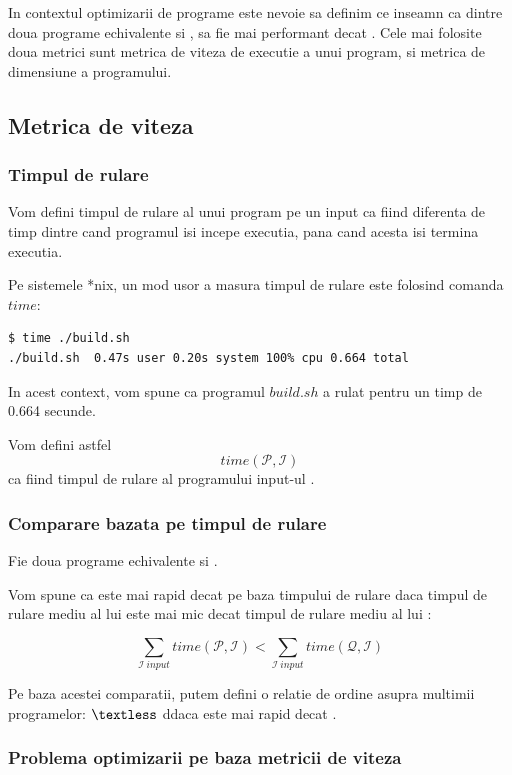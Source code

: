 In contextul optimizarii de programe este nevoie sa definim ce
inseamn ca dintre doua programe echivalente  si , 
sa fie mai performant decat .
Cele mai folosite doua metrici sunt metrica de viteza de
executie a unui program, si metrica de dimensiune a programului.

\subsection{Metrica de viteza}

\subsubsection{Timpul de rulare}

Vom defini timpul de rulare al unui program  pe un input
 ca fiind diferenta de timp dintre cand programul isi incepe
executia, pana cand acesta isi termina executia.

Pe sistemele *nix, un mod usor a masura timpul de rulare este
folosind comanda $time$:

\begin{lstlisting}[language=Bash]
$ time ./build.sh
./build.sh  0.47s user 0.20s system 100% cpu 0.664 total
\end{lstlisting}

In acest context, vom spune ca programul $build.sh$ a rulat
pentru un timp de 0.664 secunde.

Vom defini astfel \[time(\mathcal{P}, \mathcal{I})\] ca fiind
timpul de rulare al programului  input-ul .

\subsubsection{Comparare bazata pe timpul de rulare}

Fie doua programe echivalente  si .

Vom spune ca  este mai rapid decat  pe baza timpului de
rulare daca timpul de rulare mediu al lui  este mai mic
decat timpul de rulare mediu al lui :

\[
    \sum_{\mathcal{I} \ input} time(\mathcal{P}, \mathcal{I}) <
    \sum_{\mathcal{I} \ input} time(\mathcal{Q}, \mathcal{I})
\]

Pe baza acestei comparatii, putem defini o relatie de ordine
asupra multimii programelor:  $\textless$  ddaca 
este mai rapid decat .

\subsubsection{Problema optimizarii pe baza metricii de viteza}

